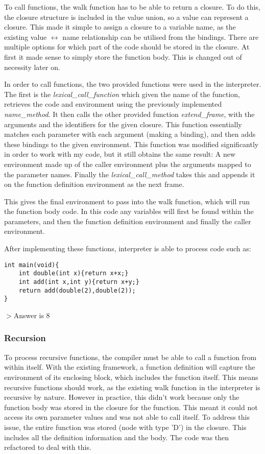 \documentclass[11pt]{article}
\begin{document}
To call functions, the walk function has to be able to return a closure. To do this, the closure structure is included in the value union, so a value can represent a closure. This made it simple to assign a closure to a variable name, as the existing value $\leftrightarrow$ name relationship can be utilised from the bindings. There are multiple options for which part of the code should be stored in the closure. At first it made sense to simply store the function body. This is changed out of necessity later on. 

In order to call functions, the two provided functions were used in the interpreter. The first is the \emph{lexical\_call\_function} which given the name of the function, retrieves the code and environment using the previously implemented \emph{name\_method}. It then calls the other provided function \emph{extend\_frame}, with the arguments and the identifiers for the given closure. This function essentially matches each parameter with each argument (making a binding), and then adds these bindings to the given environment. This function was modified significantly in order to work with my code, but it still obtains the same result: A new environment made up of the caller environment plus the arguments mapped to the parameter names. Finally the \emph{lexical\_call\_method} takes this and appends it on the function definition environment as the next frame. 

This gives the final environment to pass into the walk function, which will run the function body code. In this code any variables will first be found within the parameters, and then the function definition environment and finally the caller environment.

After implementing these functions, interpreter is able to process code such as:

\begin{lstlisting}
int main(void){
	int double(int x){return x+x;}
	int add(int x,int y){return x+y;}
	return add(double(2),double(2));
}
\end{lstlisting}
$>$Answer is 8
\\

\subsubsection{Recursion}

To process recursive functions, the compiler must be able to call a function from within itself. With the existing framework, a function definition will capture the environment of its enclosing block, which includes the function itself. This means recursive functions should work, as the existing walk function in the interpreter is recursive by nature. However in practice, this didn't work because only the function body was stored in the closure for the function. This meant it could not access its own parameter values and was not able to call itself. To address this issue, the entire function was stored (node with type 'D') in the closure. This includes all the definition information and the body. The code was then refactored to deal with this. 
\end{document}
